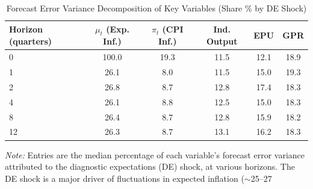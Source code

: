 \documentclass[12pt]{article}
\begin{document}
\begin{table}[!htbp]
    \centering
    \caption{Forecast Error Variance Decomposition of Key Variables (Share \% by DE Shock)}
    \label{tab:fevd}
    \begin{threeparttable}
        \begin{tabular}{lccccc}
            \toprule
            Horizon (quarters) & $\mu_t$ (Exp. Inf.) & $\pi_t$ (CPI Inf.) & Ind. Output & EPU  & GPR  \\
            \midrule
            0                  & 100.0               & 19.3               & 11.5        & 12.1 & 18.9 \\
            1                  & 26.1                & 8.0                & 11.5        & 15.0 & 19.3 \\
            2                  & 26.8                & 8.7                & 12.8        & 17.4 & 18.3 \\
            4                  & 26.1                & 8.8                & 12.5        & 15.0 & 18.3 \\
            8                  & 26.4                & 8.7                & 12.8        & 15.9 & 18.2 \\
            12                 & 26.3                & 8.7                & 13.1        & 16.2 & 18.3 \\
            \bottomrule
        \end{tabular}
        \begin{tablenotes}
            \footnotesize
            \item \textit{Note:} Entries are the median percentage of each variable's forecast error variance attributed to the diagnostic expectations (DE) shock, at various horizons. The DE shock is a major driver of fluctuations in expected inflation ($\sim$25--27%
        \end{tablenotes}
    \end{threeparttable}
\end{table}
\end{document}
